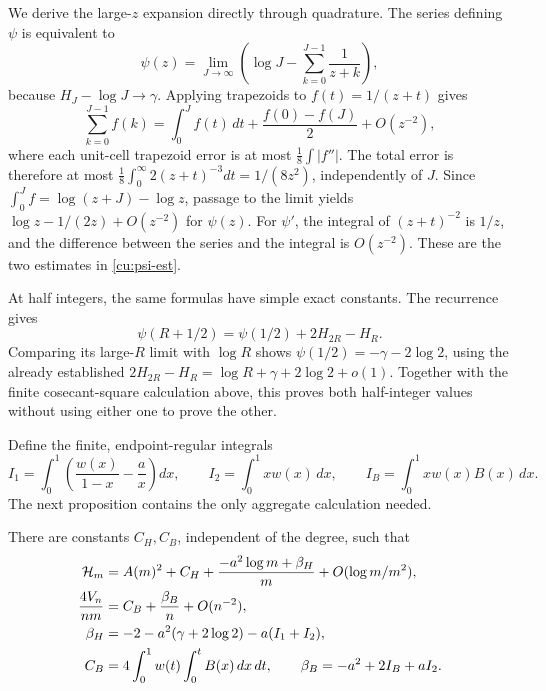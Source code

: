 We derive the large-$z$ expansion directly through quadrature. The series defining $\psi$ is equivalent to
\[
 \psi(z)=\lim_{J\to\infty}
       \left(\log J-\sum_{k=0}^{J-1}\frac1{z+k}\right),
\]
because $H_J-\log J\to\gamma$. Applying trapezoids to
$f(t)=1/(z+t)$ gives
\[
 \sum_{k=0}^{J-1}f(k)
 =\int_0^J f(t)\,dt+\frac{f(0)-f(J)}2+O(z^{-2}),
\]
where each unit-cell trapezoid error is at most
$\tfrac18\int|f''|$. The total error is therefore at most
$\tfrac18\int_0^\infty2(z+t)^{-3}dt=1/(8z^2)$,
independently of $J$. Since
$\int_0^J f=\log(z+J)-\log z$, passage to the limit yields
$\log z-1/(2z)+O(z^{-2})$ for $\psi(z)$.
For $\psi'$, the integral of $(z+t)^{-2}$ is $1/z$, and the
difference between the series and the integral is $O(z^{-2})$.
These are the two estimates in \eqref{cu:psi-est}.

At half integers, the same formulas have simple exact constants.
The recurrence gives
\[
 \psi(R+1/2)=\psi(1/2)+2H_{2R}-H_R.
\]
Comparing its large-$R$ limit with $\log R$ shows
$\psi(1/2)=-\gamma-2\log2$, using the already established
$2H_{2R}-H_R=\log R+\gamma+2\log2+o(1)$.
Together with the finite cosecant-square calculation above, this proves
both half-integer values without using either one to prove the other.

Define the finite, endpoint-regular integrals
\[
 I_1=\int_0^1\left(\frac{w(x)}{1-x}-\frac ax\right)dx,
 \qquad I_2=\int_0^1xw(x)\,dx,\qquad I_B=\int_0^1xw(x)B(x)\,dx.
\]
The next proposition contains the only aggregate calculation needed.
\begin{proposition}\label{cu:aggregate}
There are constants $C_H,C_B$, independent of the degree, such that
\begin{align}
 \mathcal H_m&=A(m)^2+C_H+
       \frac{-a^2\log m+\beta_H}{m}+O(\log m/m^2),\label{cu:H}\\
 \frac{4V_n}{nm}&=C_B+\frac{\beta_B}{n}+O(n^{-2}),\label{cu:V}\\
 \beta_H&=-2-a^2(\gamma+2\log2)-a(I_1+I_2),\notag\\
 C_B&=4\int_0^1w(t)\int_0^tB(x)\,dx\,dt,
 \qquad \beta_B=-a^2+2I_B+aI_2.\notag
\end{align}
\end{proposition}

